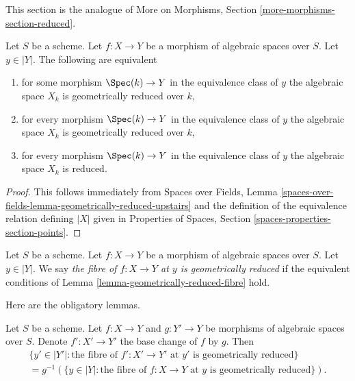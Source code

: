 \noindent
This section is the analogue of
More on Morphisms, Section \ref{more-morphisms-section-reduced}.

\begin{lemma}
\label{lemma-geometrically-reduced-fibre}
Let $S$ be a scheme. Let $f : X \to Y$ be a
morphism of algebraic spaces over $S$. Let $y \in |Y|$.
The following are equivalent
\begin{enumerate}
\item for some morphism $\Spec(k) \to Y$ in the equivalence class
of $y$ the algebraic space $X_k$ is geometrically reduced over $k$,
\item for every morphism $\Spec(k) \to Y$ in the equivalence class
of $y$ the algebraic space $X_k$ is geometrically reduced over $k$,
\item for every morphism $\Spec(k) \to Y$ in the equivalence class
of $y$ the algebraic space $X_k$ is reduced.
\end{enumerate}
\end{lemma}

\begin{proof}
This follows immediately from Spaces over Fields, Lemma
\ref{spaces-over-fields-lemma-geometrically-reduced-upstairs}
and the definition of the equivalence relation defining $|X|$
given in
Properties of Spaces, Section \ref{spaces-properties-section-points}.
\end{proof}

\begin{definition}
\label{definition-geometrically-reduced-fibre}
Let $S$ be a scheme. Let $f : X \to Y$ be a
morphism of algebraic spaces over $S$. Let $y \in |Y|$.
We say {\it the fibre of $f : X \to Y$ at $y$ is geometrically reduced}
if the equivalent conditions of
Lemma \ref{lemma-geometrically-reduced-fibre} hold.
\end{definition}

\noindent
Here are the obligatory lemmas.

\begin{lemma}
\label{lemma-base-change-fibres-geometrically-reduced}
Let $S$ be a scheme. Let $f : X \to Y$ and $g : Y' \to Y$
be morphisms of algebraic spaces over $S$. Denote
$f' : X' \to Y'$ the base change of $f$ by $g$. Then
\begin{align*}
\{y' \in |Y'| :
\text{the fibre of }f' : X' \to Y'\text{ at }y'
\text{ is geometrically reduced}\} \\
= g^{-1}(\{y \in |Y| :
\text{the fibre of }f : X \to Y\text{ at }y
\text{ is geometrically reduced}\}).
\end{align*}
\end{lemma}

